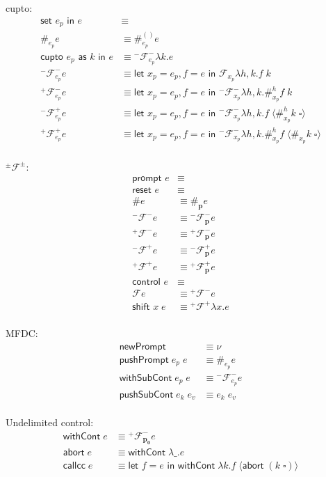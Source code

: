 \documentclass[11pt]{article}
\newcommand\x{\lambda x}
\newcommand{\letin}[2]{\textsf{let }#1\textsf{ in }#2}
\newcommand\F{\mathcal{F}}
\newcommand\pmFpm{^\pm\F^\pm}
\newcommand{\angles}[1]{\langle#1\rangle}
\begin{document}
cupto:
\begin{align*}
\textsf{set }e_p\textsf{ in }e &\equiv \\
	\#_{e_p}e &\equiv
	\#_{e_p}^{()}e
	\\
\textsf{cupto }e_p\textsf{ as }k\textsf{ in }e &\equiv
	{}^-\F^-_{e_p}\lambda k.e
	\\
^-\F^-_{e_p}e &\equiv
	\letin{x_p = e_p,f=e}{\F_{x_p}\lambda h,k.f\;k}
	\\
^+\F^-_{e_p}e &\equiv
	\letin{x_p=e_p,f=e}{^-\F_{x_p}^-\lambda h,k.\#_{x_p}^hf\;k}
	\\
^-\F^+_{e_p}e &\equiv
	\letin{x_p=e_p,f=e}{^-\F_{x_p}^-\lambda h,k.f\;\angles{\#_{x_p}^hk\;\square}}
	\\
^+\F^+_{e_p}e &\equiv
	\letin{x_p=e_p,f=e}{^-\F_{x_p}^-\lambda h,k.\#_{x_p}^hf\;\angles{\#_{x_p}k\;\square}}
	\\
\end{align*}

$\pmFpm$:
\begin{align*}
\textsf{prompt }e &\equiv\\
	\textsf{reset }e &\equiv\\
	\#e &\equiv
	\#_\mathbf{p}e
	\\
^-\F^-e &\equiv {}^-\F^-_\mathbf{p}e \\
^+\F^-e &\equiv {}^+\F^-_\mathbf{p}e \\
^-\F^+e &\equiv {}^-\F^+_\mathbf{p}e \\
^+\F^+e &\equiv {}^+\F^+_\mathbf{p}e \\
\textsf{control }e &\equiv\\
	\F e &\equiv
	{}^+\F^-e
	\\
\textsf{shift }x\;e &\equiv
	{}^+\F^+\x.e
	\\
\end{align*}

MFDC:
\begin{align*}
\textsf{newPrompt} &\equiv \nu \\
\textsf{pushPrompt}\;e_p\;e &\equiv
	\#_{e_p}e
	\\
\textsf{withSubCont}\;e_p\;e &\equiv
	{}^-\F^-_{e_p}e
	\\
\textsf{pushSubCont}\;e_k\;e_v &\equiv e_k\;e_v \\
\end{align*}

Undelimited control:
\begin{align*}
\textsf{withCont}\;e &\equiv
	{}^+\F^-_\mathbf{p_0}e
	\\
\textsf{abort}\;e &\equiv
	\textsf{withCont}\;\lambda \_.e
	\\
\textsf{callcc}\;e &\equiv
	\letin{f=e}{\textsf{withCont}\;\lambda k. f\; \angles{\textsf{abort}\;(k\;\square)}}
	\\
\end{align*}
\end{document}
